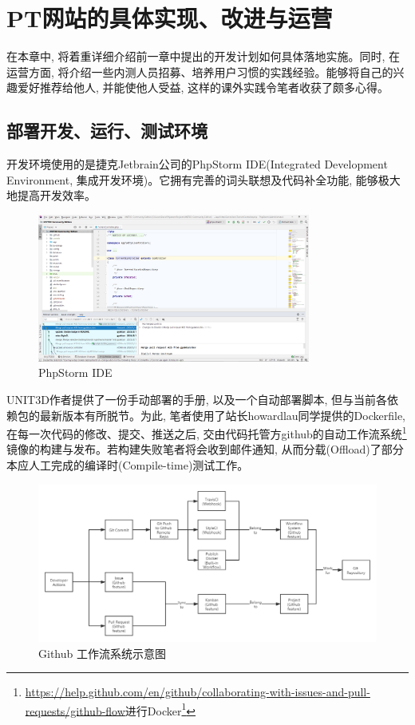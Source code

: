 \chapter{PT网站的具体实现、改进与运营}
\label{cha:experiment}

在本章中, 将着重详细介绍前一章中提出的开发计划如何具体落地实施。同时, 在运营方面, 将介绍一些内测人员招募、培养用户习惯的实践经验。能够将自己的兴趣爱好推荐给他人, 并能使他人受益, 这样的课外实践令笔者收获了颇多心得。

\section{部署开发、运行、测试环境}

开发环境使用的是捷克Jetbrain公司的PhpStorm IDE(Integrated Development Environment, 集成开发环境)。它拥有完善的词头联想及代码补全功能, 能够极大地提高开发效率。

\begin{figure}[ht]
    \centering
    \includegraphics[width=0.8\textwidth]{support-files/4.1-phpstorm-ide.png}
    \caption{PhpStorm IDE}
    \label{fig:phpstormide}
\end{figure}

UNIT3D作者提供了一份手动部署的手册, 以及一个自动部署脚本, 但与当前各依赖包的最新版本有所脱节。为此, 笔者使用了站长howardlau同学提供的Dockerfile, 在每一次代码的修改、提交、推送之后, 交由代码托管方github的自动工作流系统\footnote{\url{https://help.github.com/en/github/collaborating-with-issues-and-pull-requests/github-flow}进行Docker\footnote{https://hub.docker.com/}}镜像的构建与发布。若构建失败笔者将会收到邮件通知, 从而分载(Offload)了部分本应人工完成的编译时(Compile-time)测试工作。

\begin{figure}[ht]
    \centering
    \includegraphics[width=\textwidth]{support-files/4.1-github-workflow.png}
    \caption{Github 工作流系统示意图}
    \label{fig:githubworkflow}
\end{figure}

